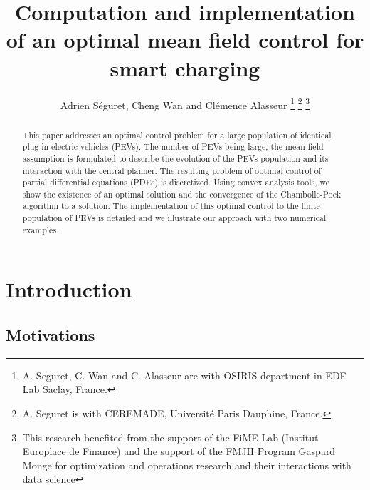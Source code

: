 \documentclass[conference]{IEEEtran}
\begin{document}
\title{Computation and implementation of an optimal mean field control for smart charging}
\author{Adrien Séguret, Cheng Wan and Clémence Alasseur
\thanks{A. Seguret, C. Wan and C. Alasseur are with OSIRIS department in EDF Lab Saclay, France.}%
\thanks{A. Seguret is with CEREMADE, Université Paris Dauphine, France.}%
\thanks{This research benefited from the support of the FiME Lab (Institut Europlace de Finance) and the support of the FMJH Program Gaspard Monge for optimization and operations research and their interactions with data science}
}
\thispagestyle{plain}
\pagestyle{plain}

\maketitle

\begin{abstract}
This paper addresses an optimal control problem for a large population of identical plug-in electric vehicles (PEVs). The number of PEVs being large,  the mean field assumption is formulated to describe the evolution of the PEVs population and its interaction with the central planner. The resulting problem of optimal control of partial differential equations (PDEs) is discretized. Using convex analysis tools, we show the existence of an optimal solution and the convergence of the Chambolle-Pock algorithm to a solution. The implementation of this optimal control to the finite population of PEVs is detailed and we illustrate our approach with two numerical examples.
\end{abstract}

\IEEEpeerreviewmaketitle

\section{Introduction}

\subsection{Motivations}
\end{document}
